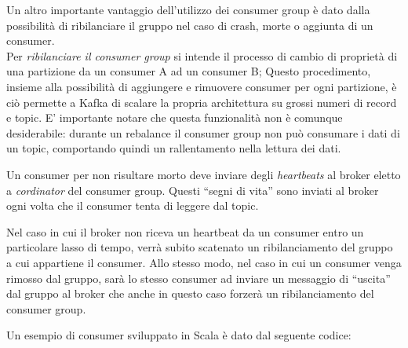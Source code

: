 \documentclass[]{article}
\begin{document}
Un altro importante vantaggio dell'utilizzo dei consumer group è dato
dalla possibilità di ribilanciare il gruppo nel caso di crash, morte o
aggiunta di un consumer.\\
Per \emph{ribilanciare il consumer group} si intende il processo di
cambio di proprietà di una partizione da un consumer A ad un consumer B;
Questo procedimento, insieme alla possibilità di aggiungere e rimuovere
consumer per ogni partizione, è ciò permette a Kafka di scalare la
propria architettura su grossi numeri di record e topic. E' importante
notare che questa funzionalità non è comunque desiderabile: durante un
rebalance il consumer group non può consumare i dati di un topic,
comportando quindi un rallentamento nella lettura dei dati.

Un consumer per non risultare morto deve inviare degli \emph{heartbeats}
al broker eletto a \emph{cordinator} del consumer group. Questi ``segni
di vita'' sono inviati al broker ogni volta che il consumer tenta di
leggere dal topic.

Nel caso in cui il broker non riceva un heartbeat da un consumer entro
un particolare lasso di tempo, verrà subito scatenato un ribilanciamento
del gruppo a cui appartiene il consumer. Allo stesso modo, nel caso in
cui un consumer venga rimosso dal gruppo, sarà lo stesso consumer ad
inviare un messaggio di ``uscita'' dal gruppo al broker che anche in
questo caso forzerà un ribilanciamento del consumer group.

Un esempio di consumer sviluppato in Scala è dato dal seguente codice:
\end{document}
